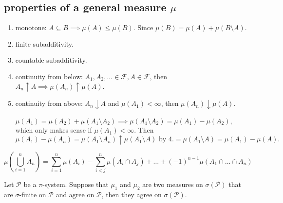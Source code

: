 \documentclass[class=article,crop=false]{standalone}
\begin{document}
\subsection{properties of a general measure $ \mu$}
\begin{enumerate}[label=\arabic*)]
	\item monotone: $ A \subseteq B \implies \mu(A) \leq \mu(B)$. Since $ \mu(B) = \mu(A) + \mu(B \setminus A)$.
	\item finite subadditivity.
	\item countable subadditivity.
	\item continuity from below: $ A_1, A_2,\ldots \in \mathcal{F}, A \in \mathcal{F}$, then $ A_n \uparrow A \implies \mu(A_n) \uparrow \mu(A)$.
	\item continuity from above: $ A_n \downarrow A$ and $ \mu(A_1) < \infty$, then $ \mu(A_n) \downarrow \mu(A)$.
		\begin{eg}[]
			$ \mu(A_1) = \mu(A_2) + \mu(A_1 \setminus A_2) \implies \mu(A_1 \setminus A_2) = \mu(A_1) - \mu(A_2)$, which only makes sense if $ \mu(A_1) < \infty$. Then 
			\[
				\mu(A_1) - \mu(A_n) = \mu(A_1 \setminus A_n) \uparrow \mu(A_1 \setminus A) \text{ by 4.} = \mu(A_1 \setminus A) = \mu(A_1) - \mu(A) 
			.\] 
		\end{eg}
\end{enumerate}	

\begin{thm}
	\[ \mu\left( \bigcup _{ i= 1}^{ n} A_n \right) = \sum_{ i= 1}^{ n} \mu(A_i) - \sum_{ i<j}^{ n} \mu(A_i \cap A_j) + \ldots+ (-1)^{n-1} \mu(A_1 \cap \ldots \cap A_n)\]
\end{thm}

\begin{thm}[10.3]
	Let $ \mathcal{P}$ be a $\pi$-system. Suppose that $ \mu_1$ and $ \mu_2$ are two measures on $ \sigma(\mathcal{P})$ that are $ \sigma$-finite on $ \mathcal{P}$ and agree on $ \mathcal{P}$, then they agree on $ \sigma(\mathcal{P})$.
\end{thm}
\end{document}
